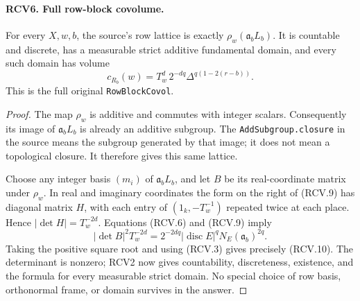 \documentclass[11pt,a4paper]{article}
\numberwithin{equation}{section}
\theoremstyle{remark}\newtheorem{remark}[theorem]{Remark}
\begin{document}
\paragraph{RCV6. Full row-block covolume.}
\label{claim:RCV6}
For every \(X,w,b\), the source's row lattice is exactly
\(\rho_w(\mathfrak a_b L_b)\).  It is countable and discrete,
has a measurable strict additive fundamental domain, and every
such domain has volume
\[
 c_{R_b}(w)=T_w^d\,2^{-dq}
                \Delta^{q(1-2(r-b))}.
\tag{RCV.10}
\]
This is the full original \texttt{Row\allowbreak Block\allowbreak Covol}.
\begin{proof}
The map \(\rho_w\) is additive and commutes with integer scalars.
Consequently its image of \(\mathfrak a_bL_b\) is already an
additive subgroup.  The \texttt{Add\allowbreak Subgroup.\allowbreak closure} in the source
means the subgroup generated by that image; it does not mean a
topological closure.  It therefore gives this same lattice.

Choose any integer basis \((m_i)\) of \(\mathfrak a_bL_b\),
and let \(B\) be its real-coordinate matrix under \(\rho_w\).
In real and imaginary coordinates the form on the right of (RCV.9)
has diagonal matrix \(H\), with each entry of
\((1_k,-T_w^{-1})\) repeated twice at each place.  Hence
\(|\det H|=T_w^{-2d}\).  Equations (RCV.6) and (RCV.9) imply
\[
 |\det B|^2 T_w^{-2d}
 =2^{-2dq}|\operatorname{disc}E|^q
                          N_E(\mathfrak a_b)^{2q}.
\]
Taking the positive square root and using (RCV.3) gives precisely
(RCV.10).  The determinant is nonzero; RCV2 now gives countability,
discreteness, existence, and the formula for every measurable
strict domain.  No special choice of row basis, orthonormal frame,
or domain survives in the answer.
\end{proof}

\end{document}
